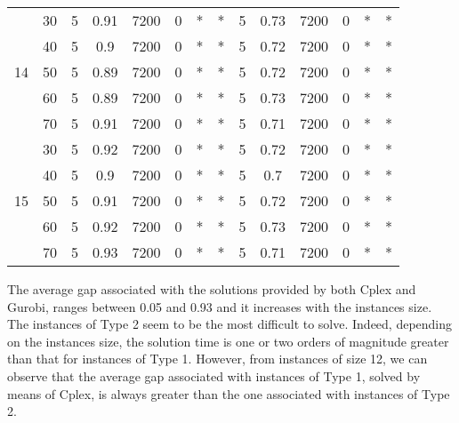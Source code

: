\documentclass{itor}
\theoremstyle{definition}
\theoremstyle{remark}
\begin{document}
\begin{table}[htbp]
\begin{tabular}{|c|c|cccccc|cccccc|}
    \midrule
          & 30    & 5     & 0.91  & 7200  & 0     & *     & *     & 5     & 0.73  & 7200  & 0     & *     & * \\
          & 40    & 5     & 0.9   & 7200  & 0     & *     & *     & 5     & 0.72  & 7200  & 0     & *     & * \\
    14    & 50    & 5     & 0.89  & 7200  & 0     & *     & *     & 5     & 0.72  & 7200  & 0     & *     & * \\
          & 60    & 5     & 0.89  & 7200  & 0     & *     & *     & 5     & 0.73  & 7200  & 0     & *     & * \\
          & 70    & 5     & 0.91  & 7200  & 0     & *     & *     & 5     & 0.71  & 7200  & 0     & *     & * \\
    \midrule
          & 30    & 5     & 0.92  & 7200  & 0     & *     & *     & 5     & 0.72  & 7200  & 0     & *     & * \\
          & 40    & 5     & 0.9   & 7200  & 0     & *     & *     & 5     & 0.7   & 7200  & 0     & *     & * \\
    15    & 50    & 5     & 0.91  & 7200  & 0     & *     & *     & 5     & 0.72  & 7200  & 0     & *     & * \\
          & 60    & 5     & 0.92  & 7200  & 0     & *     & *     & 5     & 0.73  & 7200  & 0     & *     & * \\
          & 70    & 5     & 0.93  & 7200  & 0     & *     & *     & 5     & 0.71  & 7200  & 0     & *     & * \\
    \bottomrule
    \end{tabular}%
  \label{table:tab1}%
\end{table}%


\noindent



The average gap associated with the solutions provided by both Cplex and Gurobi, ranges between 0.05 and 0.93 and it increases with the instances size. The instances of Type 2 seem to be the most difficult to solve. Indeed, depending on the instances size, the solution time is one or two orders of magnitude greater than that for instances of Type 1. However, from instances of size 12, we can observe that the average gap associated with instances of Type 1, solved by means of Cplex, is always greater than the one associated with instances of Type 2.
\end{document}
